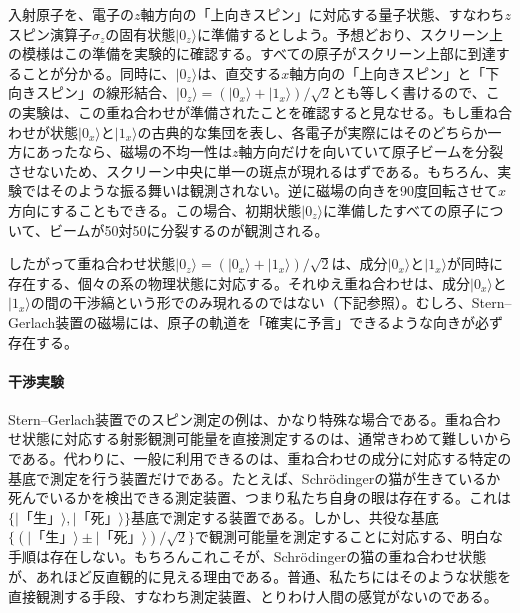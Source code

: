 \hypertarget{srcpage:23}{}\label{srcpage:23}
入射原子を、電子の$z$軸方向の「上向きスピン」に対応する量子状態、すなわち$z$スピン演算子$\hat\sigma_z$の固有状態$\lvert0_z\rangle$に準備するとしよう。予想どおり、スクリーン上の模様はこの準備を実験的に確認する。すべての原子がスクリーン上部に到達することが分かる。同時に、$\lvert0_z\rangle$は、直交する$x$軸方向の「上向きスピン」と「下向きスピン」の線形結合、$\lvert0_z\rangle=(\lvert0_x\rangle+\lvert1_x\rangle)/\sqrt2$とも等しく書けるので、この実験は、この重ね合わせが準備されたことを確認すると見なせる。もし重ね合わせが状態$\lvert0_x\rangle$と$\lvert1_x\rangle$の古典的な集団を表し、各電子が実際にはそのどちらか一方にあったなら、磁場の不均一性は$z$軸方向だけを向いていて原子ビームを分裂させないため、スクリーン中央に単一の斑点が現れるはずである。もちろん、実験ではそのような振る舞いは観測されない。逆に磁場の向きを90度回転させて$x$方向にすることもできる。この場合、初期状態$\lvert0_z\rangle$に準備したすべての原子について、ビームが50対50に分裂するのが観測される。

したがって重ね合わせ状態$\lvert0_z\rangle=(\lvert0_x\rangle+\lvert1_x\rangle)/\sqrt2$は、成分$\lvert0_x\rangle$と$\lvert1_x\rangle$が同時に存在する、個々の系の物理状態に対応する。それゆえ重ね合わせは、成分$\lvert0_x\rangle$と$\lvert1_x\rangle$の間の干渉縞という形でのみ現れるのではない（下記参照）。むしろ、Stern--Gerlach装置の磁場には、原子の軌道を「確実に予言」できるような向きが必ず存在する\cite{ref010,ref039}。

\paragraph{干渉実験}
Stern--Gerlach装置でのスピン測定の例は、かなり特殊な場合である。重ね合わせ状態に対応する射影観測可能量を直接測定するのは、通常きわめて難しいからである。代わりに、一般に利用できるのは、重ね合わせの成分に対応する特定の基底で測定を行う装置だけである。たとえば、Schrödingerの猫が生きているか死んでいるかを検出できる測定装置、つまり私たち自身の眼は存在する。これは$\{\lvert\text{「生」}\rangle,\lvert\text{「死」}\rangle\}$基底で測定する装置である。しかし、共役な基底$\{(\lvert\text{「生」}\rangle\pm\lvert\text{「死」}\rangle)/\sqrt2\}$で観測可能量を測定することに対応する、明白な手順は存在しない。もちろんこれこそが、Schrödingerの猫の重ね合わせ状態が、あれほど反直観的に見える理由である。普通、私たちにはそのような状態を直接観測する手段、すなわち測定装置、とりわけ人間の感覚がないのである。

